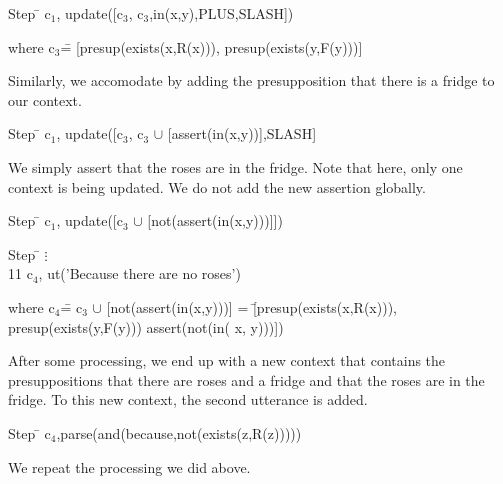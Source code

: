 \documentclass{article}
\begin{document}
\begin{tabbing}
Step \= \> c$_1$, update([c$_3$, c$_3$,in(x,y),PLUS,SLASH])
\end{tabbing}

\begin{tabbing}
where c$_3$\= = [presup(exists(x,R(x))), presup(exists(y,F(y)))]
\end{tabbing}

Similarly, we accomodate by adding the presupposition that there is a
fridge to our context.

\begin{tabbing}
Step \= \> c$_1$, update([c$_3$, c$_3$ $\cup$ [assert(in(x,y))],SLASH]
\end{tabbing}

We simply assert that the roses are in the fridge. Note that here,
only one context is being updated. We do not add the new assertion
globally. 

\begin{tabbing}
Step \= \> c$_1$, update([c$_3$ $\cup$ [not(assert(in(x,y)))]])
\end{tabbing}

\begin{tabbing}
Step \= \kill
\>$\vdots$\\
11\> c$_4$, ut('Because there are no roses')
\end{tabbing}

\begin{tabbing}
where c$_4$\= = c$_3$ $\cup$ [not(assert(in(x,y)))] 
 = \=[presup(exists(x,R(x))), presup(exists(y,F(y))) assert(not(in( x, y)))])
\end{tabbing}



After some processing, we end up with a new context that contains the
presuppositions that there are roses and a fridge and that the roses
are in the fridge. To this new context, the second utterance is added.


\begin{tabbing}
Step \= \> c$_4$,parse(and(because,not(exists(z,R(z)))))
\end{tabbing}

We repeat the processing we did above.
\end{document}
